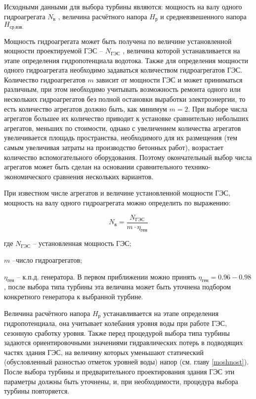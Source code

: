 Исходными данными для выбора турбины являются: мощность на валу одного гидроагрегата $N_{\text{в}}$ , величина расчётного напора $H_{\text{р}}$ и средневзвешенного напора $H_{\text{ср.взв.}}$

Мощность гидроагрегата может быть получена по величине установленной мощности проектируемой ГЭС -- $N_{\text{ГЭС}}$ , величина которой устанавливается на этапе определения гидропотенциала водотока. Также для определения мощности одного гидроагрегата необходимо задаваться количеством гидроагрегатов ГЭС. Количество гидроагрегатов $m$ зависит от мощности ГЭС и может приниматься различным, при этом необходимо учитывать возможность ремонта одного или нескольких гидроагрегатов без полной остановки выработки электроэнергии, то есть количество агрегатов должно быть, как минимум $m = 2$. При выборе числа агрегатов большее их количество приводит к установке сравнительно небольших агрегатов, меньших по стоимости, однако с увеличением количества агрегатов увеличивается площадь пространства, необходимого для их размещения (тем самым увеличивая затраты на производство бетонных работ), возрастает количество вспомогательного оборудования. Поэтому окончательный выбор числа агрегатов может быть сделан на основании сравнительного технико-экономического сравнения нескольких вариантов.

При известном числе агрегатов и величине установленной мощности ГЭС, мощность на валу одного гидроагрегата можно определить по выражению:

\begin{equation}
\label{eq_fyl}
   N_{\text{в}} =\frac{N_{\text{ГЭС}}}{ m \cdot \eta_{ \text{ген}}}
\end{equation}

где $N_{\text{ГЭС}}$ -- установленная мощность ГЭС;

$m$ --число гидроагрегатов;

$\eta_{ \text{ген}}$ -- к.п.д. генератора. В первом приближении можно принять $\eta_{ \text{ген}} = 0.
96 - 0.98 \,$, после выбора типа турбины эта величина может быть уточнена подбором конкретного генератора к выбранной турбине.

\vspace{0.5cm}

Величина расчётного напора $H_{\text{р}}$ устанавливается на этапе определения гидропотенциала, она учитывает колебания уровня воды при работе ГЭС,  сезонную сработку уровня. Также перед процедурой выбора типа турбины задаются ориентировочными значениями гидравлических потерь в подводящих частях здания ГЭС, на величину которых уменьшают статический (обусловленный разностью отметок уровней воды) напор (см. главу \ref{moshnost}). После выбора турбины и предварительного проектирования здания ГЭС эти параметры должны быть уточнены, и, при необходимости, процедура выбора турбины повторяется.

